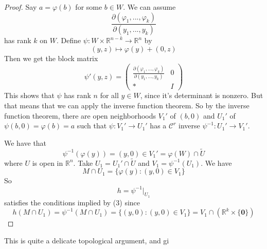 \documentclass{article}
\newcommand{\reals}[0]{\mathbb{R}}
\newcommand{\mc}[1]{\mathcal{#1}}
\newcommand{\prt}[2]{\frac{\partial #1}{\partial #2}}
\newcommand{\mb}[1]{\mathbf{#1}}
\begin{document}
\begin{proof}
  Say \(a = \varphi(b)\) for some \(b \in W\). We can assume
  \[\prt{(\varphi_1,...,\varphi_k)}{(y_1,...,y_k)}\]
  has rank \(k\) on \(W\).
  Define \(\psi: W \times \reals^{n - k} \to\reals^n\) by
  \[(y, z) \mapsto \varphi(y) + (0, z)\]
  Then we get the block matrix
  \[\psi'(y, z) = \begin{pmatrix}
    \prt{(\varphi_1,...,\varphi_k)}{(y_1,...,y_k)} & 0 \\
    * & I
  \end{pmatrix}\]
  This shows that \(\psi\) has rank \(n\) for all \(y \in W\), since it's determinant is nonzero. But that means that we can apply the inverse function theorem. So by the inverse function theorem, there are open neighborhoods \(V_1'\) of \((b, 0)\) and \(U_1'\) of \(\psi(b, 0) = \varphi(b) = a\) such that \(\psi: V_1' \to U_1'\) has a \(\mc{C}^r\) inverse \(\psi^{-1}: U_1' \to V_1'\).

  We have that
  \[\psi^{-1}(\varphi(y)) = (y, 0) \in V_1' = \varphi(W) \cap \widetilde U\]
  where \(U\) is open in \(\reals^n\). Take \(U_1 = U_1' \cap \widetilde U\) and \(V_1 = \psi^{-1}(U_1)\). We have
  \[M \cap U_1 = \{\varphi(y) : (y, 0) \in V_1\}\]
  So
  \[h = \psi^{-1}|_{U_1}\]
  satisfies the conditions implied by (3) since
  \[h(M \cap U_1) = \psi^{-1}(M \cap U_1) = \{(y, 0) : (y, 0) \in V_1\} = V_1 \cap (\reals^k \times \{\mb{0}\})\]
\end{proof}
This is quite a delicate topological argument, and gi
\end{document}

